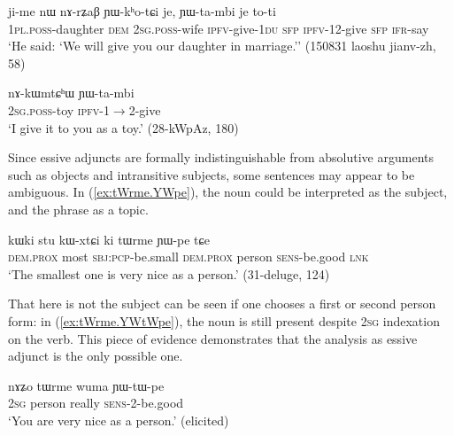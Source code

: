 \begin{exe}
\ex \label{ex:nArZaB.YWkhotCi}
\gll  ji-me nɯ nɤ-rʑaβ ɲɯ-kʰo-tɕi je, ɲɯ-ta-mbi je to-ti\\
 \textsc{1pl}.\textsc{poss}-daughter \textsc{dem} \textsc{2sg}.\textsc{poss}-wife \textsc{ipfv}-give-\textsc{1du} \textsc{sfp} \textsc{ipfv}-1\fl{}2-give \textsc{sfp} \textsc{ifr}-say \\
 \glt `He said: `We will give you our daughter in marriage.'' (150831 laoshu jianv-zh, 58)
\end{exe} 

\begin{exe}
\ex \label{ex:nAkWmtChW.YWtambi}
\gll  nɤ-kɯmtɕʰɯ ɲɯ-ta-mbi \\
 \textsc{2sg}.\textsc{poss}-toy \textsc{ipfv}-1$\rightarrow$2-give   \\
 \glt `I give it to you as a toy.' (28-kWpAz, 180)
\end{exe}

Since essive adjuncts are formally indistinguishable from absolutive arguments such as objects and intransitive subjects, some sentences may appear to be ambiguous. In (\ref{ex:tWrme.YWpe}), the noun  could be interpreted as the subject, and the phrase  as a topic.

\begin{exe}
\ex \label{ex:tWrme.YWpe}
\gll kɯki stu kɯ-xtɕi ki tɯrme ɲɯ-pe tɕe \\
\textsc{dem}.\textsc{prox} most \textsc{sbj}:\textsc{pcp}-be.small \textsc{dem}.\textsc{prox} person \textsc{sens}-be.good \textsc{lnk} \\
\glt `The smallest one is very nice as a person.' (31-deluge, 124)
\end{exe}

That  here is not the subject can be seen if one chooses a first or second person form: in (\ref{ex:tWrme.YWtWpe}), the noun  is still present despite \textsc{2sg} indexation on the verb. This piece of evidence demonstrates that the analysis as essive adjunct is the only possible one.

\begin{exe}
\ex \label{ex:tWrme.YWtWpe}
\gll  nɤʑo tɯrme wuma ɲɯ-tɯ-pe \\
\textsc{2sg} person really \textsc{sens}-2-be.good \\
\glt `You are very nice as a person.'  (elicited)
\end{exe}


